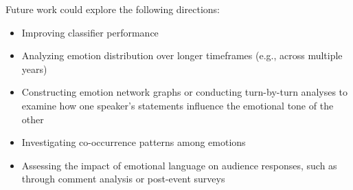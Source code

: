 \documentclass[pdflatex,sn-mathphys-num]{sn-jnl}%
\begin{document}
Future work could explore the following directions:

\begin{itemize}
	\item Improving classifier performance 
	\item Analyzing emotion distribution over longer timeframes (e.g., across multiple years)
	\item Constructing emotion network graphs or conducting turn-by-turn analyses to examine how one speaker’s statements influence the emotional tone of the other
	\item Investigating co-occurrence patterns among emotions
	\item Assessing the impact of emotional language on audience responses, such as through comment analysis or post-event surveys
\end{itemize}
\end{document}
